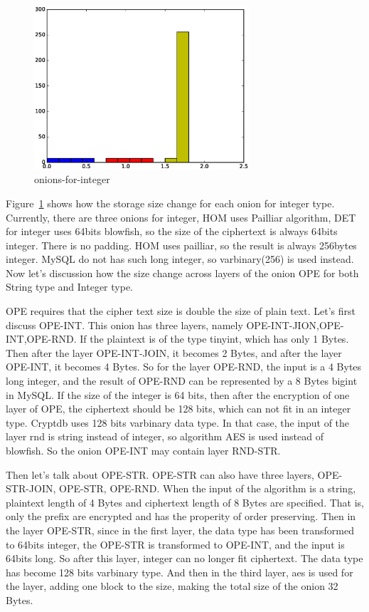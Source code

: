 \begin{figure}[tb]
\centering
\includegraphics[width=8cm]{images/onion-for-integer.eps}
\caption{onions-for-integer}
\label{fig:stack6}
\end{figure}


Figure~\ref{fig:stack6} shows how the storage size change for each onion for integer type. Currently, there are three onions for integer, HOM uses Pailliar algorithm, DET for integer uses 64bits blowfish, so the size of the ciphertext is always 64bits integer. There is no padding. HOM uses pailliar, so the result is always 256bytes integer. MySQL do not has such long integer, so varbinary(256) is used instead. Now let's discussion how the size change across layers of the onion OPE for both String type and Integer type. 



OPE requires that the cipher text size is double the size of plain text. Let's first discuss OPE-INT. This onion has three layers, namely OPE-INT-JION,OPE-INT,OPE-RND. If the plaintext is of the type tinyint, which has only 1 Bytes. Then after the layer OPE-INT-JOIN, it becomes 2 Bytes, and after the layer OPE-INT, it becomes 4 Bytes. So for the layer OPE-RND, the input is a 4 Bytes long integer, and the result of OPE-RND can be represented by a 8 Bytes bigint in MySQL. If the size of the integer is 64 bits, then after the encryption of one layer of OPE, the ciphertext should be 128 bits, which can not fit in an integer type. Cryptdb uses 128 bits varbinary data type. In that case, the input of the layer rnd is string instead of integer, so algorithm AES is used instead of blowfish. So the onion OPE-INT may contain layer RND-STR. 

Then let's talk about OPE-STR. OPE-STR can also have three layers, OPE-STR-JOIN, OPE-STR, OPE-RND. When the input of the algorithm is a string, plaintext length of 4 Bytes and  ciphertext length of 8 Bytes are specified. That is, only the prefix are encrypted and has the properity of order preserving. Then in the layer OPE-STR, since in the first layer, the data type has been transformed to 64bits integer, the OPE-STR is transformed to OPE-INT, and the input is 64bits long. So after this layer, integer can no longer fit ciphertext. The data type has become 128 bits varbinary type. And then in the third layer, aes is used for the layer, adding one block to the size, making the total size of the onion 32 Bytes.



